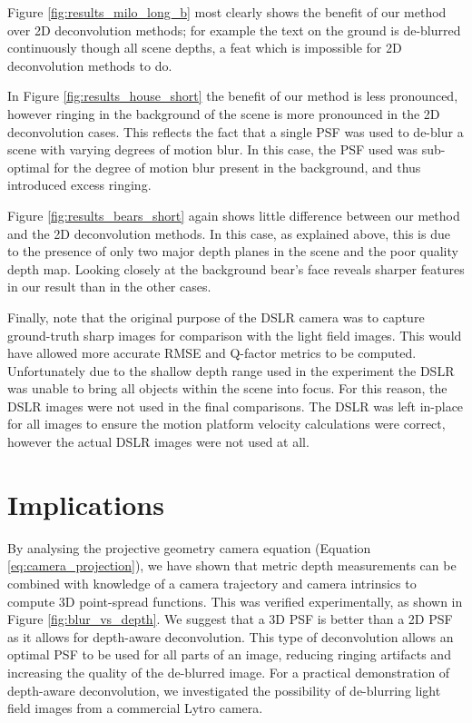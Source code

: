 Figure \ref{fig:results_milo_long_b} most clearly shows the benefit of our method over 2D deconvolution methods; for example the text on the ground is de-blurred continuously though all scene depths, a feat which is impossible for 2D deconvolution methods to do.

In Figure \ref{fig:results_house_short} the benefit of our method is less pronounced, however ringing in the background of the scene is more pronounced in the 2D deconvolution cases.
This reflects the fact that a single PSF was used to de-blur a scene with varying degrees of motion blur.
In this case, the PSF used was sub-optimal for the degree of motion blur present in the background, and thus introduced excess ringing.

Figure \ref{fig:results_bears_short} again shows little difference between our method and the 2D deconvolution methods.
In this case, as explained above, this is due to the presence of only two major depth planes in the scene and the poor quality depth map.
Looking closely at the background bear's face reveals sharper features in our result than in the other cases.

Finally, note that the original purpose of the DSLR camera was to capture ground-truth sharp images for comparison with the light field images.
This would have allowed more accurate RMSE and Q-factor metrics to be computed.
Unfortunately due to the shallow depth range used in the experiment the DSLR was unable to bring all objects within the scene into focus.
For this reason, the DSLR images were not used in the final comparisons.
The DSLR was left in-place for all images to ensure the motion platform velocity calculations were correct, however the actual DSLR images were not used at all.

\section{Implications}
\label{sec:implications}

By analysing the projective geometry camera equation (Equation \ref{eq:camera_projection}), we have shown that metric depth measurements can be combined with knowledge of a camera trajectory and camera intrinsics to compute 3D point-spread functions.
This was verified experimentally, as shown in Figure \ref{fig:blur_vs_depth}.
We suggest that a 3D PSF is better than a 2D PSF as it allows for depth-aware deconvolution.
This type of deconvolution allows an optimal PSF to be used for all parts of an image, reducing ringing artifacts and increasing the quality of the de-blurred image.
For a practical demonstration of depth-aware deconvolution, we investigated the possibility of de-blurring light field images from a commercial Lytro camera.

